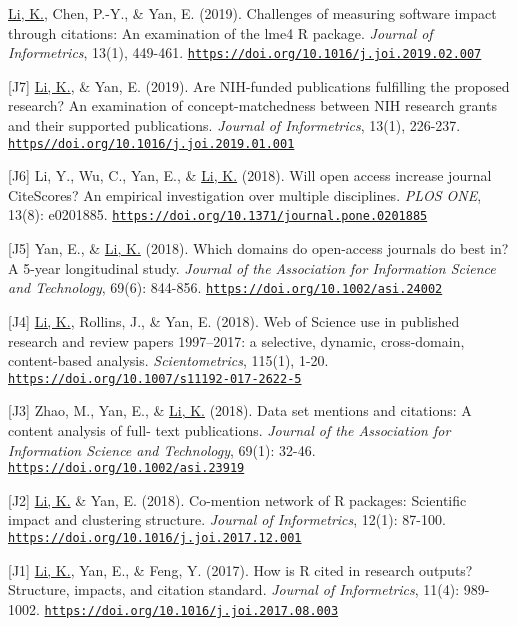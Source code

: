 \documentclass[margin, 10pt]{res} %
\begin{document}
\begin{resume}
[J8] \underline{Li, K.}, Chen, P.-Y., \& Yan, E. (2019). Challenges of measuring software impact through citations: An examination of the lme4 R package. \textit{Journal of Informetrics}, 13(1), 449-461. \href{https://doi.org/10.1016/j.joi.2019.02.007}{\nolinkurl{https://doi.org/10.1016/j.joi.2019.02.007}}

[J7] \underline{Li, K.}, \& Yan, E. (2019). Are NIH-funded publications fulfilling the proposed research? An examination of concept-matchedness between NIH research grants and their supported publications. \textit{Journal of Informetrics}, 13(1), 226-237. \href{https//doi.org/10.1016/j.joi.2019.01.001}{\nolinkurl{https//doi.org/10.1016/j.joi.2019.01.001}}

[J6] Li, Y., Wu, C., Yan, E., \& \underline{Li, K.} (2018). Will open access increase journal CiteScores? An empirical investigation over multiple disciplines. \textit{PLOS ONE}, 13(8): e0201885. \href{https://doi.org/10.1371/journal.pone.0201885}{\nolinkurl{https://doi.org/10.1371/journal.pone.0201885}}

[J5] Yan, E., \& \underline{Li, K.} (2018). Which domains do open-access journals do best in? A 5-year longitudinal study. \textit{Journal of the Association for Information Science and Technology}, 69(6): 844-856. \href{https://doi.org/10.1002/asi.24002}{\nolinkurl{https://doi.org/10.1002/asi.24002}}

[J4] \underline{Li, K.}, Rollins, J., \& Yan, E. (2018). Web of Science use in published research and review papers 1997–2017: a selective, dynamic, cross-domain, content-based analysis. \textit{Scientometrics}, 115(1), 1-20. \href{https://doi.org/10.1007/s11192-017-2622-5}{\nolinkurl{https://doi.org/10.1007/s11192-017-2622-5}} 

[J3] Zhao, M., Yan, E., \& \underline{Li, K.} (2018). Data set mentions and citations: A content analysis of full- text publications. \textit{Journal of the Association for Information Science and Technology}, 69(1): 32-46. \href{https://doi.org/10.1002/asi.23919}{\nolinkurl{https://doi.org/10.1002/asi.23919}}

[J2] \underline{Li, K.} \& Yan, E. (2018). Co-mention network of R packages: Scientific impact and clustering structure. \textit{Journal of Informetrics}, 12(1): 87-100. \href{https://doi.org/10.1016/j.joi.2017.12.001}{\nolinkurl{https://doi.org/10.1016/j.joi.2017.12.001}}

[J1] \underline{Li, K.}, Yan, E., \& Feng, Y. (2017). How is R cited in research outputs? Structure, impacts, and citation standard. \textit{Journal of Informetrics}, 11(4): 989-1002. \href{https://doi.org/10.1016/j.joi.2017.08.003}{\nolinkurl{https://doi.org/10.1016/j.joi.2017.08.003}}


\end{resume}
\end{document}
